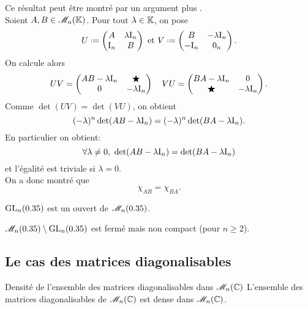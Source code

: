 Ce résultat peut être montré par un argument plus . \\
Soient $A, B \in \mathscr{M}_n(\mathbb{K})$. Pour tout $\lambda \in \mathbb{K}$, on pose
$$
U \defeq
\begin{pmatrix}
    A & \lambda \I_n \\
    \I_n & B
\end{pmatrix}
\text{ et }
V \defeq 
\begin{pmatrix}
    B & -\lambda \I_n \\
    -\I_n & 0_n
\end{pmatrix}.
$$
On calcule alors
$$UV = 
\begin{pmatrix}
    AB - \lambda \mathrm{I}_n & \bigstar \\
    0 & -\lambda \mathrm{I}_n
\end{pmatrix}
\quad
VU = 
\begin{pmatrix}
    BA - \lambda \mathrm{I}_n & 0 \\
    \bigstar & -\lambda \mathrm{I}_n
\end{pmatrix}.
$$
Comme $\det(UV) = \det(VU)$, on obtient
$$(-\lambda)^n \det(AB - \lambda \mathrm{I}_n) = (-\lambda)^n \det(BA - \lambda \mathrm{I}_n).$$
En particulier on obtient:
$$\forall \lambda \not= 0,\ \det(AB - \lambda \mathrm{I}_n) = \det(BA - \lambda \mathrm{I}_n)$$
et l'égalité est triviale si $\lambda = 0$. \\
On a donc montré que 
$$\chi_{A B} = \chi_{B A}.$$

\begin{prop}{}
    $\mathrm{GL}_n(0.35)$ est un ouvert de $\mathscr{M}_n(0.35)$.
\end{prop}

\begin{preuve}
    
\end{preuve}

\begin{prop}{}
    $\mathscr{M}_n(0.35) \setminus \mathrm{GL}_n(0.35)$ est fermé mais non compact (pour $n \geqslant 2$).
\end{prop}

\subsection{Le cas des matrices diagonalisables}

\begin{theo}{Densité de l'ensemble des matrices diagonalisables dans  $\mathscr{M}_n(\mathbb{C})$}
    L'ensemble des matrices diagonalisables de $\mathscr{M}_n(\mathbb{C})$ est dense dans $\mathscr{M}_n(\mathbb{C})$.
\end{theo}

